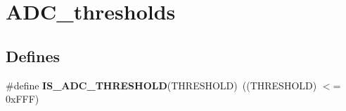 \hypertarget{group__ADC__thresholds}{
\section{ADC\_\-thresholds}
\label{group__ADC__thresholds}
}
\subsection*{Defines}
\begin{DoxyCompactItemize}
\item 
\hypertarget{group__ADC__thresholds_gaa71cdff6dafddfccff8a7e88768bfb54}{
\#define {\bfseries IS\_\-ADC\_\-THRESHOLD}(THRESHOLD)~((THRESHOLD) $<$= 0xFFF)}
\label{group__ADC__thresholds_gaa71cdff6dafddfccff8a7e88768bfb54}

\end{DoxyCompactItemize}
